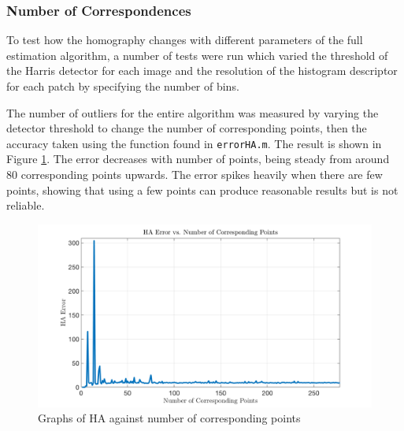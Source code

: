 \documentclass[a4paper, 10pt, conference]{ieeeconf}
\begin{document}


\subsubsection{Number of Correspondences}


To test how the homography changes with different parameters of the full estimation algorithm, a number of tests were run which varied the threshold of the Harris detector for each image and the resolution of the histogram descriptor for each patch by specifying the number of bins.


The number of outliers for the entire algorithm was measured by varying the detector threshold to change the number of corresponding points, then the accuracy taken using the function found in \texttt{errorHA.m}. The result is shown in Figure \ref{fig:outliers}. The error decreases with number of points, being steady from around 80 corresponding points upwards. The error spikes heavily when there are few points, showing that using a few points can produce reasonable results but is not reliable.


\begin{figure}[!ht]
  \centering
  \includegraphics[width=\linewidth]{pic/q2_1_c}
  \caption{Graphs of HA against number of corresponding points}
  \label{fig:outliers}
\end{figure}
\end{document}
